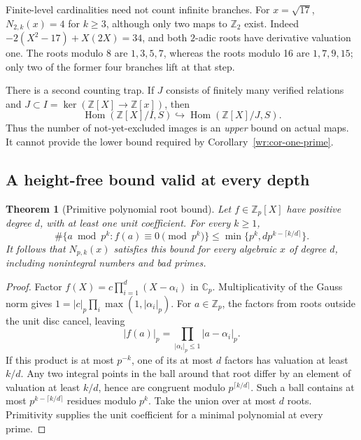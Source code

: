 \documentclass[11pt,a4paper]{article}
\newcommand{\Z}{\mathbb Z}
\newcommand{\C}{\mathbb C}
\newtheorem{theorem}{Theorem}[section]
\theoremstyle{definition}
\theoremstyle{remark}
\numberwithin{equation}{section}
\begin{document}
Finite-level cardinalities need not count infinite branches. For
\(x=\sqrt{17}\), \(N_{2,k}(x)=4\) for \(k\ge3\), although only two
maps to \(\Z_2\) exist. Indeed \(-2(X^2-17)+X(2X)=34\), and both
\(2\)-adic roots have derivative valuation one. The roots modulo 8
are \(1,3,5,7\), whereas the roots modulo 16 are \(1,7,9,15\);
only two of the former four branches lift at that step.

There is a second counting trap. If \(J\) consists of finitely many
verified relations and \(J\subset I=\ker(\Z[X]\to\Z[x])\), then
\begin{equation}\label{wr:eq-map-inclusion}
 \operatorname{Hom}(\Z[X]/I,S)
 \hookrightarrow\operatorname{Hom}(\Z[X]/J,S).
\end{equation}
Thus the number of not-yet-excluded images is an \emph{upper} bound on
actual maps. It cannot provide the lower bound required by
Corollary~\ref{wr:cor-one-prime}.

\subsection{A height-free bound valid at every depth}

\begin{theorem}[Primitive polynomial root bound]\label{wr:thm-height-free}
Let \(f\in\Z_p[X]\) have positive degree \(d\), with at least one unit
coefficient. For every \(k\ge1\),
\begin{equation}\label{wr:eq-height-free}
 \#\{a\bmod p^k:f(a)\equiv0\pmod{p^k}\}
 \le\min\{p^k,d p^{k-\lceil k/d\rceil}\}.
\end{equation}
It follows that \(N_{p,k}(x)\) satisfies this bound for every algebraic
\(x\) of degree \(d\), including nonintegral numbers and bad primes.
\end{theorem}
\begin{proof}
Factor \(f(X)=c\prod_{i=1}^d(X-\alpha_i)\) in \(\C_p\). Multiplicativity
of the Gauss norm gives
\(1=|c|_p\prod_i\max(1,|\alpha_i|_p)\). For \(a\in\Z_p\), the
factors from roots outside the unit disc cancel, leaving
\[
 |f(a)|_p=\prod_{|\alpha_i|_p\le1}|a-\alpha_i|_p.
\]
If this product is at most \(p^{-k}\), one of its at most \(d\) factors
has valuation at least \(k/d\). Any two integral points in the ball
around that root differ by an element of valuation at least \(k/d\),
hence are congruent modulo \(p^{\lceil k/d\rceil}\). Such a ball
contains at most \(p^{k-\lceil k/d\rceil}\) residues modulo \(p^k\).
Take the union over at most \(d\) roots. Primitivity supplies the unit
coefficient for a minimal polynomial at every prime.
\end{proof}
\end{document}
